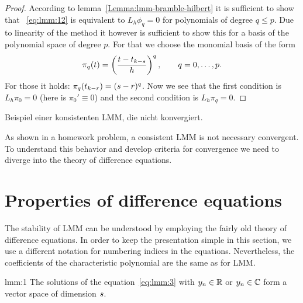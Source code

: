 \begin{proof}
  According to lemma~\ref{Lemma:lmm-bramble-hilbert} it is sufficient
  to show that ~\eqref{eq:lmm:12} is equivalent to $L_h \phi_q=0$ for
  polynomials of degree $q\le p$. Due to linearity of the method it
  however is sufficient to show this for a basis of the polynomial
  space of degree $p$.  For that we choose the monomial basis of the
  form
  \begin{gather*}
  \pi_q(t) =
  \left(\frac{t-t_{k-s}}h\right)^q,\qquad q=0,\dots,p.
  \end{gather*}
  For those it holds: $\pi_q(t_{k-r}) = (s-r)^q$. Now we see that
  the first condition is $L_h\pi_0 = 0$ (here is
  $\pi_0'\equiv0$) and the second condition is $L_h\pi_q = 0$.
\end{proof}

\begin{todo}
  Beispiel einer konsistenten LMM, die nicht konvergiert.
\end{todo}

\begin{remark}
  As shown in a homework problem, a consistent LMM is not necessary
  convergent. To understand this behavior and develop criteria for
  convergence we need to diverge into the theory of difference
  equations.
\end{remark}
\section{Properties of difference equations}

\begin{intro}
  The stability of LMM can be understood by employing the fairly old
  theory of difference equations. In order to keep the presentation
  simple in this section, we use a different notation for numbering
  indices in the equations. Nevertheless, the coefficients of the
  characteristic polynomial are the same as for LMM.
\end{intro}



\begin{Lemma}{lmm:1}
  The solutions of the equation~\eqref{eq:lmm:3} with $y_n\in \mathbb R$ or
  $y_n\in \mathbb C$ form a vector space of dimension $s$. 
\end{Lemma}

